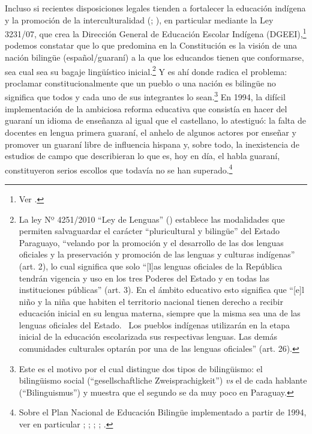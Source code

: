 \documentclass[output=paper]{langscibook}
\begin{document}
Incluso si recientes disposiciones legales tienden a fortalecer la educación indígena y la promoción de la interculturalidad (\citealt{GómezBote2019}; \citealt{Tauli-Corpuz2015}), en particular mediante la Ley 3231/07, que crea la Dirección General de Educación Escolar Indígena (DGEEI),\footnote{Ver \citet{RepúblicadelParaguay2007}.} podemos constatar que lo que predomina en la Constitución es la visión de una nación bilingüe (español/guaraní) a la que los educandos tienen que conformarse, sea cual sea su bagaje lingüístico inicial.\footnote{La ley Nº 4251/2010 “Ley de Lenguas” (\citealt{RepúblicadelParaguay2010}) establece las modalidades que permiten salvaguardar el carácter “pluricultural y bilingüe” del Estado Paraguayo, “velando por la promoción y el desarrollo de las dos lenguas oficiales y la preservación y promoción de las lenguas y culturas indígenas” (art. 2), lo cual significa que solo “[l]as lenguas oficiales de la República tendrán vigencia y uso en los tres Poderes del Estado y en todas las instituciones públicas” (art. 3). En el ámbito educativo esto significa que “[e]l niño y la niña que habiten el territorio nacional tienen derecho a recibir educación inicial en su lengua materna, siempre que la misma sea una de las lenguas oficiales del Estado.~ Los pueblos indígenas utilizarán en la etapa inicial de la educación escolarizada sus respectivas lenguas. Las demás comunidades culturales optarán por una de las lenguas oficiales” (art. 26).} Y es ahí donde radica el problema: proclamar constitucionalmente que un pueblo o una nación es bilingüe no significa que todos y cada uno de sus integrantes lo sean.\footnote{Este es el motivo por el cual \citet[70]{Fasoli-Wörmann2002} distingue dos tipos de bilingüismo: el bilingüismo social (“gesellschaftliche Zweisprachigkeit”) \textit{vs} el de cada hablante (“Bilinguismus”) y muestra que el segundo se da muy poco en Paraguay.} En 1994, la difícil implementación de la ambiciosa reforma educativa que consistía en hacer del guaraní un idioma de enseñanza al igual que el castellano, lo atestiguó: la falta de docentes en lengua primera guaraní, el anhelo de algunos actores por enseñar y promover un guaraní libre de influencia hispana y, sobre todo, la inexistencia de estudios de campo que describieran lo que es, hoy en día, el habla guaraní, constituyeron serios escollos que todavía no se han superado.\footnote{Sobre el Plan Nacional de Educación Bilingüe implementado a partir de 1994, ver en particular \citealt{Boidin2014a};    \citealt{BoyerNatali2006}; \citealt{Hauck2014}; \citealt{Penner2014}; \citealt{Zimmermann2002}.}
\end{document}
